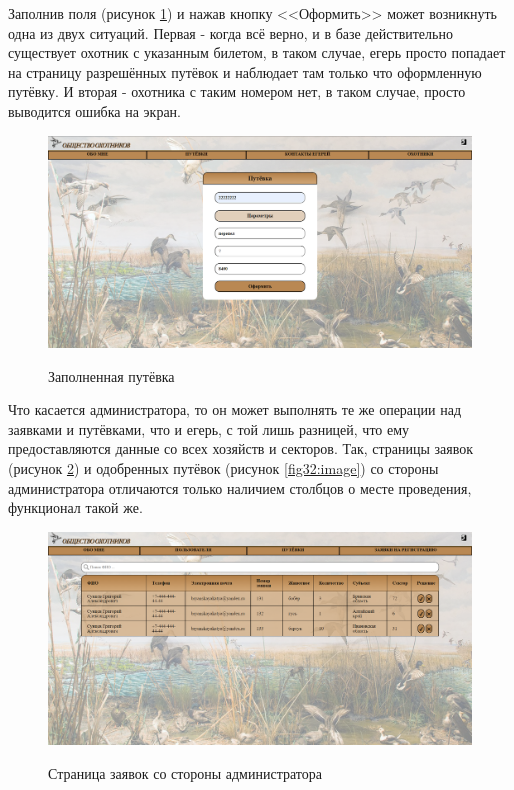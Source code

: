 	Заполнив поля (рисунок \ref{fig30:image}) и нажав кнопку <<Оформить>> может возникнуть одна из двух ситуаций. Первая - когда всё верно, и в базе действительно существует охотник с указанным билетом, в таком случае, егерь просто попадает на страницу разрешённых путёвок и наблюдает там только что оформленную путёвку. И вторая - охотника с таким номером нет, в таком случае, просто выводится ошибка на экран.
	
	\begin{figure}[h!]
		\centering
		\begin{center}
			{\includegraphics[scale=0.34]{schemes/screens/created_huntsman.png}}
			\caption{Заполненная путёвка}
			\label{fig30:image}
		\end{center}
	\end{figure}
	
	Что касается администратора, то он может выполнять те же операции над заявками и путёвками, что и егерь, с той лишь разницей, что ему предоставляются данные со всех хозяйств и секторов. Так, страницы заявок (рисунок \ref{fig31:image}) и одобренных путёвок (рисунок \ref{fig32:image}) со стороны администратора отличаются только наличием столбцов о месте проведения, функционал такой же.
	
	\begin{figure}[h!]
		\centering
		\begin{center}
			{\includegraphics[scale=0.34]{schemes/screens/requests_admin.png}}
			\caption{Страница заявок со стороны администратора}
			\label{fig31:image}
		\end{center}
	\end{figure}

